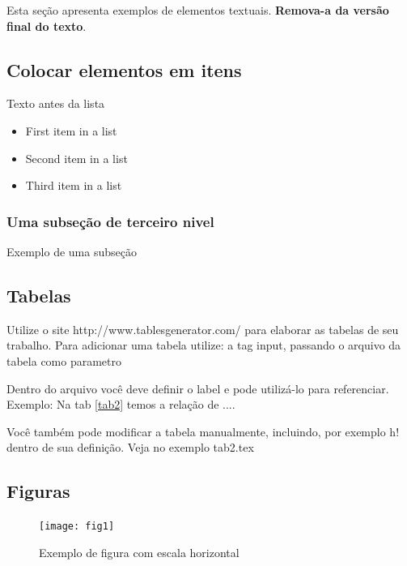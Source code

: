 \documentclass[	DIV=calc,%
							paper=a4,%
							fontsize=12pt,%
							onecolumn]{scrartcl}	 					%
\begin{document}
Esta seção apresenta exemplos de elementos textuais. \textbf{Remova-a da versão final do texto}.


\subsection{Colocar elementos em itens}

Texto antes da lista

\begin{itemize}
	\item First item in a list 
	\item Second item in a list 
	\item Third item in a list
\end{itemize}

\subsubsection{Uma subseção de terceiro nivel}

Exemplo de uma subseção

\subsection{Tabelas}

Utilize o site http://www.tablesgenerator.com/ para elaborar as tabelas de seu trabalho.
Para adicionar uma tabela utilize: a tag input, passando o arquivo da tabela como parametro



Dentro do arquivo você deve definir o label e pode utilizá-lo para referenciar. Exemplo:
Na tab \ref{tab2} temos a relação de ....


Você também pode modificar a tabela manualmente, incluindo, por exemplo h! dentro de sua definição. Veja no exemplo tab2.tex

\subsection{Figuras}



\begin{figure}
\centering
\texttt{[image: fig1]}
\caption{Exemplo de figura com escala horizontal}
\label{fig1}
\end{figure}
\end{document}
